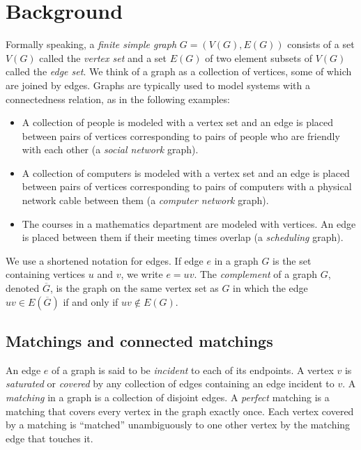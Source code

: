 \section{Background}
	

Formally speaking, a {\it finite simple graph}  $G = (V(G), E(G))$ consists of a set $V(G)$ called the {\it vertex set}  and a set $E(G)$ of two element subsets of $V(G)$ called the {\it edge set}.  We think of a graph as a collection of vertices, some of which are joined by edges.  Graphs are typically used to model systems with a connectedness relation, as in the following examples:
	\begin{itemize}
		\item A collection of people is modeled with a vertex set and an edge is placed between pairs of vertices corresponding to pairs of people who are friendly with each other (a {\it social network} graph).
		\item A collection of computers is modeled with a vertex set and an edge is placed between pairs of vertices corresponding to pairs of computers with a physical network cable between them (a {\it computer network} graph).
		\item The courses in a mathematics department are modeled with vertices. An edge is placed between them if their meeting times overlap (a {\it scheduling} graph).
	\end{itemize}
We use a shortened notation for edges.  If edge $e$ in a graph $G$ is the set containing vertices $u$ and $v$, we write $e = uv$.  The {\it complement} of a graph $G$, denoted $\overline{G}$, is the graph on the same vertex set as $G$ in which the edge $uv \in E(\overline{G})$ if and only if $uv \notin E(G)$.

\subsection{Matchings and connected matchings}
An edge $e$ of a graph is said to be {\it incident} to each of its endpoints.  A vertex $v$ is {\it saturated} or {\it covered} by any collection of edges containing an edge incident to $v$.
A {\it matching} in a graph is a collection of disjoint edges.  A {\it perfect} matching is a matching that covers every vertex in the graph exactly once.  Each vertex covered by a matching is ``matched'' unambiguously to one other vertex by the matching edge that touches it.  

